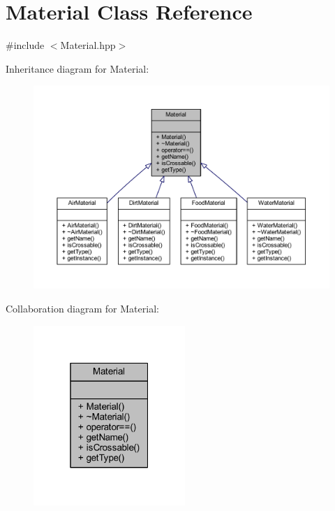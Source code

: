 \hypertarget{class_material}{}\section{Material Class Reference}
\label{class_material}


{\ttfamily \#include $<$Material.\+hpp$>$}



Inheritance diagram for Material\+:\nopagebreak
\begin{figure}[H]
\begin{center}
\leavevmode
\includegraphics[width=350pt]{class_material__inherit__graph}
\end{center}
\end{figure}


Collaboration diagram for Material\+:\nopagebreak
\begin{figure}[H]
\begin{center}
\leavevmode
\includegraphics[width=163pt]{class_material__coll__graph}
\end{center}
\end{figure}
